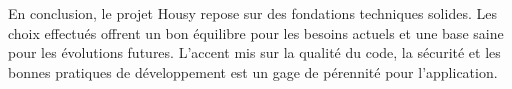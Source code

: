 \documentclass[11pt,a4paper]{report}
\begin{document}
En conclusion, le projet Housy repose sur des fondations techniques solides. Les choix effectués offrent un bon équilibre pour les besoins actuels et une base saine pour les évolutions futures. L'accent mis sur la qualité du code, la sécurité et les bonnes pratiques de développement est un gage de pérennité pour l'application.

\end{document}
